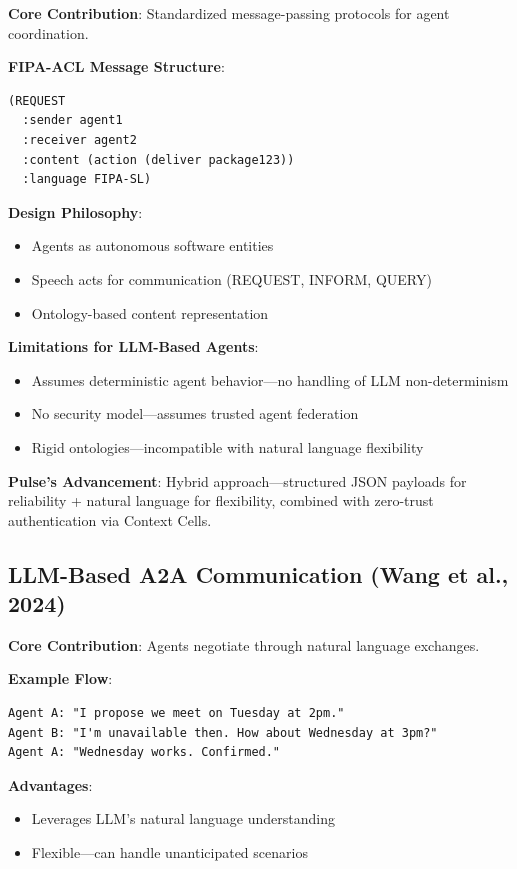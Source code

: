 \textbf{Core Contribution}: Standardized message-passing protocols for agent coordination.

\textbf{FIPA-ACL Message Structure}:
\begin{verbatim}
(REQUEST
  :sender agent1
  :receiver agent2
  :content (action (deliver package123))
  :language FIPA-SL)
\end{verbatim}

\textbf{Design Philosophy}:
\begin{itemize}
    \item Agents as autonomous software entities
    \item Speech acts for communication (REQUEST, INFORM, QUERY)
    \item Ontology-based content representation
\end{itemize}

\textbf{Limitations for LLM-Based Agents}:
\begin{itemize}
    \item Assumes deterministic agent behavior—no handling of LLM non-determinism
    \item No security model—assumes trusted agent federation
    \item Rigid ontologies—incompatible with natural language flexibility
\end{itemize}

\textbf{Pulse's Advancement}: Hybrid approach—structured JSON payloads for reliability + natural language for flexibility, combined with zero-trust authentication via Context Cells.

\subsection{LLM-Based A2A Communication (Wang et al., 2024)}

\textbf{Core Contribution}: Agents negotiate through natural language exchanges.

\textbf{Example Flow}:
\begin{verbatim}
Agent A: "I propose we meet on Tuesday at 2pm."
Agent B: "I'm unavailable then. How about Wednesday at 3pm?"
Agent A: "Wednesday works. Confirmed."
\end{verbatim}

\textbf{Advantages}:
\begin{itemize}
    \item Leverages LLM's natural language understanding
    \item Flexible—can handle unanticipated scenarios
\end{itemize}

